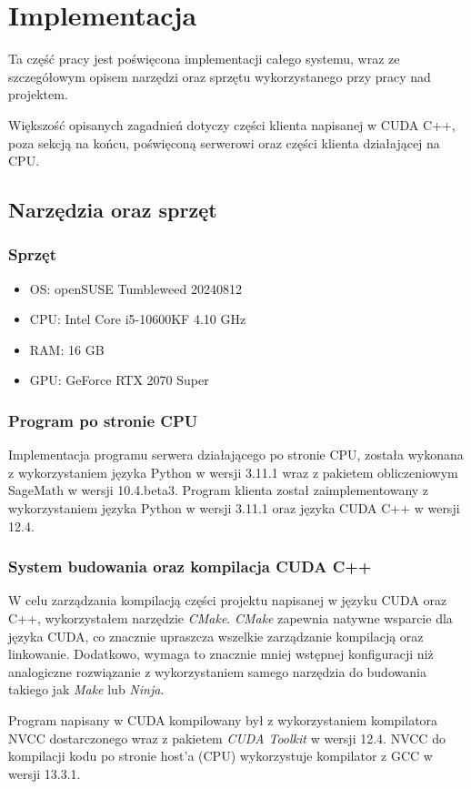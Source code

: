 \newpage
\section{Implementacja}
Ta część pracy jest poświęcona implementacji całego systemu,
wraz ze szczegółowym opisem narzędzi oraz sprzętu wykorzystanego
przy pracy nad projektem.
\par
Większość opisanych zagadnień dotyczy części klienta napisanej w CUDA C++,
poza sekcją na końcu, poświęconą serwerowi oraz części klienta działającej na CPU.

\subsection{Narzędzia oraz sprzęt}
\subsubsection{Sprzęt}
\begin{itemize}
    \item OS: openSUSE Tumbleweed 20240812
    \item CPU: Intel Core i5-10600KF 4.10 GHz
    \item RAM: 16 GB
    \item GPU: GeForce RTX 2070 Super
\end{itemize}

\subsubsection{Program po stronie CPU}
Implementacja programu serwera działającego po stronie CPU, została wykonana z wykorzystaniem
języka Python w wersji 3.11.1 wraz z pakietem obliczeniowym SageMath w wersji 10.4.beta3.
Program klienta został zaimplementowany z wykorzystaniem języka Python w wersji 3.11.1 oraz
języka CUDA C++ w wersji 12.4.

\subsubsection{System budowania oraz kompilacja CUDA C++}
W celu zarządzania kompilacją części projektu napisanej w języku CUDA oraz C++,
wykorzystałem narzędzie \textit{CMake}.
\textit{CMake} zapewnia natywne wsparcie dla języka CUDA,
co znacznie upraszcza wszelkie zarządzanie kompilacją oraz linkowanie.
Dodatkowo, wymaga to znacznie mniej wstępnej konfiguracji niż analogiczne
rozwiązanie z wykorzystaniem samego narzędzia do budowania takiego jak \textit{Make} lub \textit{Ninja}.
\par
Program napisany w CUDA kompilowany był z wykorzystaniem kompilatora NVCC dostarczonego wraz z pakietem
\textit{CUDA Toolkit} w wersji 12.4.
NVCC do kompilacji kodu po stronie host'a (CPU) wykorzystuje kompilator z GCC w wersji 13.3.1.


